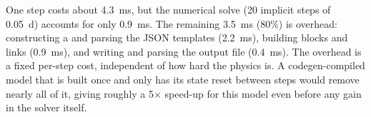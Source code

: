 One step costs about 4.3~ms, but the numerical solve (20 implicit steps of 0.05~d) accounts for only 0.9~ms. The remaining 3.5~ms (80\%) is overhead: constructing a  and parsing the JSON templates (2.2~ms), building blocks and links (0.9~ms), and writing and parsing the output file (0.4~ms). The overhead is a fixed per-step cost, independent of how hard the physics is. A codegen-compiled model that is built once and only has its state reset between steps would remove nearly all of it, giving roughly a 5$\times$ speed-up for this model even before any gain in the solver itself.
